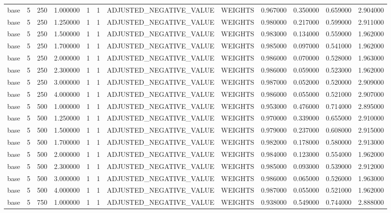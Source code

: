 \begin{tabular}{lrrrllllrrrr}
base & 5 & 250 & 1.000000 & 1 & 1 & ADJUSTED_NEGATIVE_VALUE & WEIGHTS & 0.967000 & 0.350000 & 0.659000 & 2.904000 \\
base & 5 & 250 & 1.250000 & 1 & 1 & ADJUSTED_NEGATIVE_VALUE & WEIGHTS & 0.980000 & 0.217000 & 0.599000 & 2.911000 \\
base & 5 & 250 & 1.500000 & 1 & 1 & ADJUSTED_NEGATIVE_VALUE & WEIGHTS & 0.983000 & 0.134000 & 0.559000 & 1.962000 \\
base & 5 & 250 & 1.700000 & 1 & 1 & ADJUSTED_NEGATIVE_VALUE & WEIGHTS & 0.985000 & 0.097000 & 0.541000 & 1.962000 \\
base & 5 & 250 & 2.000000 & 1 & 1 & ADJUSTED_NEGATIVE_VALUE & WEIGHTS & 0.986000 & 0.070000 & 0.528000 & 1.963000 \\
base & 5 & 250 & 2.300000 & 1 & 1 & ADJUSTED_NEGATIVE_VALUE & WEIGHTS & 0.986000 & 0.059000 & 0.523000 & 1.962000 \\
base & 5 & 250 & 3.000000 & 1 & 1 & ADJUSTED_NEGATIVE_VALUE & WEIGHTS & 0.987000 & 0.052000 & 0.520000 & 2.909000 \\
base & 5 & 250 & 4.000000 & 1 & 1 & ADJUSTED_NEGATIVE_VALUE & WEIGHTS & 0.986000 & 0.055000 & 0.521000 & 2.907000 \\
base & 5 & 500 & 1.000000 & 1 & 1 & ADJUSTED_NEGATIVE_VALUE & WEIGHTS & 0.953000 & 0.476000 & 0.714000 & 2.895000 \\
base & 5 & 500 & 1.250000 & 1 & 1 & ADJUSTED_NEGATIVE_VALUE & WEIGHTS & 0.970000 & 0.339000 & 0.655000 & 2.910000 \\
base & 5 & 500 & 1.500000 & 1 & 1 & ADJUSTED_NEGATIVE_VALUE & WEIGHTS & 0.979000 & 0.237000 & 0.608000 & 2.915000 \\
base & 5 & 500 & 1.700000 & 1 & 1 & ADJUSTED_NEGATIVE_VALUE & WEIGHTS & 0.982000 & 0.178000 & 0.580000 & 2.913000 \\
base & 5 & 500 & 2.000000 & 1 & 1 & ADJUSTED_NEGATIVE_VALUE & WEIGHTS & 0.984000 & 0.123000 & 0.554000 & 1.962000 \\
base & 5 & 500 & 2.300000 & 1 & 1 & ADJUSTED_NEGATIVE_VALUE & WEIGHTS & 0.985000 & 0.093000 & 0.539000 & 2.912000 \\
base & 5 & 500 & 3.000000 & 1 & 1 & ADJUSTED_NEGATIVE_VALUE & WEIGHTS & 0.986000 & 0.065000 & 0.526000 & 1.963000 \\
base & 5 & 500 & 4.000000 & 1 & 1 & ADJUSTED_NEGATIVE_VALUE & WEIGHTS & 0.987000 & 0.055000 & 0.521000 & 1.962000 \\
base & 5 & 750 & 1.000000 & 1 & 1 & ADJUSTED_NEGATIVE_VALUE & WEIGHTS & 0.938000 & 0.549000 & 0.744000 & 2.888000 \\

\end{tabular}

